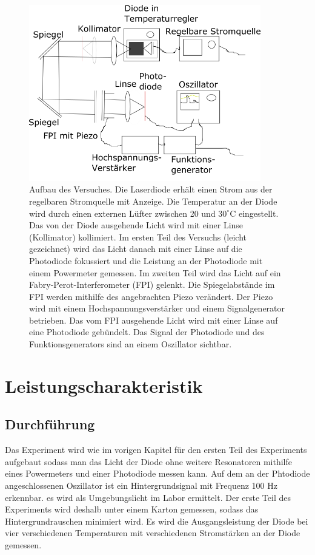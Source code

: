 \documentclass[a4paper,10pt]{scrartcl} %
\begin{document}
\begin{figure}
\centering
\includegraphics[width= 0.9\textwidth]{Bilder/Aufbau.png}
\caption{Aufbau des Versuches. Die Laserdiode erhält einen Strom aus der regelbaren Stromquelle mit Anzeige. Die Temperatur an der Diode wird durch einen externen Lüfter zwischen 20 und $30^\circ{\text{C}}$ eingestellt. Das von der Diode ausgehende Licht wird mit einer Linse (Kollimator) kollimiert. Im ersten Teil des Versuchs (leicht gezeichnet) wird das Licht danach mit einer Linse auf die Photodiode fokussiert und die Leistung an der Photodiode mit einem Powermeter gemessen. Im zweiten Teil wird das Licht auf ein Fabry-Perot-Interferometer (FPI) gelenkt. Die Spiegelabstände im FPI werden mithilfe des angebrachten Piezo verändert. Der Piezo wird mit einem Hochspannungsverstärker und einem Signalgenerator betrieben. Das vom FPI ausgehende Licht wird mit einer Linse auf eine Photodiode gebündelt. Das Signal der Photodiode und des Funktionsgenerators sind an einem Oszillator sichtbar.
}
\label{fig:Aufbau}
\end{figure}


\section{Leistungscharakteristik}
\label{sec:Leistungscharakteristik}

\subsection{Durchführung}
\label{subsec:Leistung_Durchfuehrung}
Das Experiment wird wie im vorigen Kapitel für den ersten Teil des Experiments aufgebaut sodass man das Licht der Diode ohne weitere Resonatoren mithilfe eines Powermeters und einer Photodiode messen kann. Auf dem an der Phtodiode angeschlossenen Oszillator ist ein Hintergrundsignal mit Frequenz 100 Hz erkennbar. es wird als Umgebungslicht im Labor ermittelt. Der erste Teil des Experiments wird deshalb unter einem Karton gemessen, sodass das Hintergrundrauschen minimiert wird. Es wird die Ausgangsleistung der Diode bei vier verschiedenen Temperaturen mit verschiedenen Stromstärken an der Diode gemessen.
\end{document}
